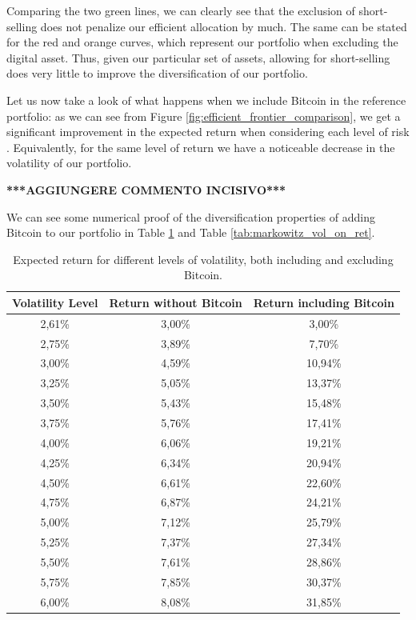 Comparing the two green lines, we can clearly see that the exclusion of short-selling does not penalize our efficient allocation by much. The same can be stated for the red and orange curves, which represent our portfolio when excluding the digital asset.
Thus, given our particular set of assets, allowing for short-selling does very little to improve the diversification of our portfolio.

Let us now take a look of what happens when we include Bitcoin in the reference portfolio: as we can see from Figure \ref{fig:efficient_frontier_comparison}, we get a significant improvement in the expected return when considering each level of risk . Equivalently, for the same level of return we have a noticeable decrease in the volatility of our portfolio.

\textbf{***AGGIUNGERE COMMENTO INCISIVO***}

We can see some numerical proof of the diversification properties of adding Bitcoin to our portfolio in Table \ref{tab:markowitz_ret_on_vol} and Table	\ref{tab:markowitz_vol_on_ret}.

\begin{table}
\begin{tabular}{ccc}
\toprule
Volatility Level & Return without Bitcoin & Return including Bitcoin \\
\midrule
2,61\% & 3,00\% & 3,00\% \\
2,75\% & 3,89\% & 7,70\% \\
3,00\% & 4,59\% & 10,94\% \\
3,25\% & 5,05\% & 13,37\% \\
3,50\% & 5,43\% & 15,48\% \\
3,75\% & 5,76\% & 17,41\% \\
4,00\% & 6,06\% & 19,21\% \\
4,25\% & 6,34\% & 20,94\% \\
4,50\% & 6,61\% & 22,60\% \\
4,75\% & 6,87\% & 24,21\% \\
5,00\% & 7,12\% & 25,79\% \\
5,25\% & 7,37\% & 27,34\% \\
5,50\% & 7,61\% & 28,86\% \\
5,75\% & 7,85\% & 30,37\% \\
6,00\% & 8,08\% & 31,85\% \\
\bottomrule
\end{tabular}
\caption{Expected return for different levels of volatility, both including and excluding Bitcoin.}
\label{tab:markowitz_ret_on_vol}
\end{table}

